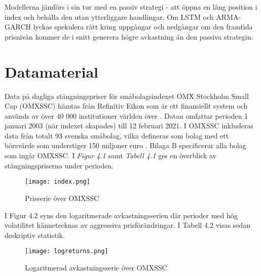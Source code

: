 \documentclass[11pt]{article}
\numberwithin{equation}{section}
\numberwithin{table}{section}
\numberwithin{figure}{section}
\begin{document}
Modellerna jämförs i sin tur med en passiv strategi - att öppna en lång position i index och behålla den utan ytterliggare handlingar. Om LSTM och ARMA-GARCH lyckas spekulera rätt kring uppgångar och nedgångar om den framtida prisnivån kommer de i snitt generera högre avkastning än den passiva strategin. 

\newpage
\section{Datamaterial}

Data på dagliga stängningspriser för småbolagsindexet OMX Stockholm Small Cap (OMXSSC) hämtas från Refinitiv Eikon som är ett finansiellt system och används av över 40 000 institutioner världen över \parencite{Eikon}. Datan omfattar perioden 1 januari 2003 (när indexet skapades) till 12 februari 2021. I OMXSSC inkluderas data från totalt 93 svenska småbolag, vilka defineras som bolag med ett börsvärde som understiger 150 miljoner euro \parencite{smabalagsdefinition}. Bilaga B specificerar alla bolag som ingår OMXSSC. I \emph{Figur 4.1} samt \textit{Tabell 4.1} ges en överblick av stängningspriserna under perioden. 

\begin{figure}[H]
\caption{Prisserie över OMXSSC}
\texttt{[image: index.png]}
\centering
\end{figure}


\begin{table}[H]
\caption{Deskprivtiv statistik över priser i OMXSSC}
\end{table}

I Figur 4.2 syns den logaritmerade avkastningsserien där perioder med hög volatilitet kännetecknas av aggressiva prisförändringar. I Tabell 4.2 visas sedan deskriptiv statistik. 

\begin{figure}[H]
\caption{Logaritmerad avkastningsserie över OMXSSC}
\texttt{[image: logreturns.png]}
\centering
\end{figure}
\end{document}
